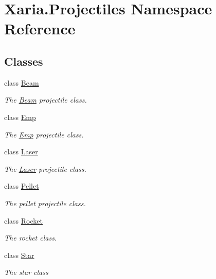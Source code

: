 \hypertarget{namespaceXaria_1_1Projectiles}{}\section{Xaria.\+Projectiles Namespace Reference}
\label{namespaceXaria_1_1Projectiles}
\subsection*{Classes}
\begin{DoxyCompactItemize}
\item 
class \hyperlink{classXaria_1_1Projectiles_1_1Beam}{Beam}
\begin{DoxyCompactList}\small\item\em The \hyperlink{classXaria_1_1Projectiles_1_1Beam}{Beam} projectile class. \end{DoxyCompactList}\item 
class \hyperlink{classXaria_1_1Projectiles_1_1Emp}{Emp}
\begin{DoxyCompactList}\small\item\em The \hyperlink{classXaria_1_1Projectiles_1_1Emp}{Emp} projectile class. \end{DoxyCompactList}\item 
class \hyperlink{classXaria_1_1Projectiles_1_1Laser}{Laser}
\begin{DoxyCompactList}\small\item\em The \hyperlink{classXaria_1_1Projectiles_1_1Laser}{Laser} projectile class. \end{DoxyCompactList}\item 
class \hyperlink{classXaria_1_1Projectiles_1_1Pellet}{Pellet}
\begin{DoxyCompactList}\small\item\em The pellet projectile class. \end{DoxyCompactList}\item 
class \hyperlink{classXaria_1_1Projectiles_1_1Rocket}{Rocket}
\begin{DoxyCompactList}\small\item\em The rocket class. \end{DoxyCompactList}\item 
class \hyperlink{classXaria_1_1Projectiles_1_1Star}{Star}
\begin{DoxyCompactList}\small\item\em The star class \end{DoxyCompactList}\end{DoxyCompactItemize}

